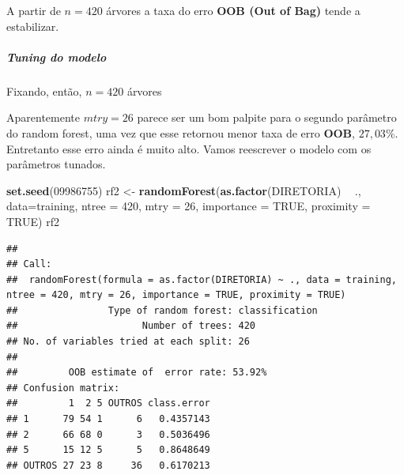 \documentclass[]{article}
\newenvironment{Shaded}{\begin{snugshade}}{\end{snugshade}}
\newcommand{\CommentTok}[1]{\textcolor[rgb]{0.56,0.35,0.01}{\textit{#1}}}
\newcommand{\DataTypeTok}[1]{\textcolor[rgb]{0.13,0.29,0.53}{#1}}
\newcommand{\DecValTok}[1]{\textcolor[rgb]{0.00,0.00,0.81}{#1}}
\newcommand{\KeywordTok}[1]{\textcolor[rgb]{0.13,0.29,0.53}{\textbf{#1}}}
\newcommand{\NormalTok}[1]{#1}
\newcommand{\OperatorTok}[1]{\textcolor[rgb]{0.81,0.36,0.00}{\textbf{#1}}}
\newcommand{\OtherTok}[1]{\textcolor[rgb]{0.56,0.35,0.01}{#1}}
\newcommand{\StringTok}[1]{\textcolor[rgb]{0.31,0.60,0.02}{#1}}
\let\oldsubparagraph\subparagraph
\renewcommand{\subparagraph}[1]{\oldsubparagraph{#1}\mbox{}}
\begin{document}
A partir de \(n=420\) árvores a taxa do erro \textbf{OOB (Out of Bag)}
tende a estabilizar.

\hypertarget{tuning-do-modelo}{%
\subparagraph{Tuning do modelo}\label{tuning-do-modelo}}

Fixando, então, \(n=420\) árvores

Aparentemente \(mtry = 26\) parece ser um bom palpite para o segundo
parâmetro do random forest, uma vez que esse retornou menor taxa de erro
\textbf{OOB}, \(27,03\%\). Entretanto esse erro ainda é muito alto.
Vamos reescrever o modelo com os parâmetros tunados.

\begin{Shaded}
\begin{Highlighting}[]
\KeywordTok{set.seed}\NormalTok{(}\DecValTok{09986755}\NormalTok{)}
\NormalTok{rf2 <-}\StringTok{ }\KeywordTok{randomForest}\NormalTok{(}\KeywordTok{as.factor}\NormalTok{(DIRETORIA) }\OperatorTok{~}\StringTok{ }\NormalTok{., }\DataTypeTok{data=}\NormalTok{training,}
                    \DataTypeTok{ntree =} \DecValTok{420}\NormalTok{,}
                    \DataTypeTok{mtry =} \DecValTok{26}\NormalTok{,}
                    \DataTypeTok{importance =} \OtherTok{TRUE}\NormalTok{,}
                    \DataTypeTok{proximity =} \OtherTok{TRUE}\NormalTok{)}
\NormalTok{rf2}
\end{Highlighting}
\end{Shaded}

\begin{verbatim}
## 
## Call:
##  randomForest(formula = as.factor(DIRETORIA) ~ ., data = training,      ntree = 420, mtry = 26, importance = TRUE, proximity = TRUE) 
##                Type of random forest: classification
##                      Number of trees: 420
## No. of variables tried at each split: 26
## 
##         OOB estimate of  error rate: 53.92%
## Confusion matrix:
##         1  2 5 OUTROS class.error
## 1      79 54 1      6   0.4357143
## 2      66 68 0      3   0.5036496
## 5      15 12 5      5   0.8648649
## OUTROS 27 23 8     36   0.6170213
\end{verbatim}

\begin{Shaded}
\end{Shaded}
\end{document}
